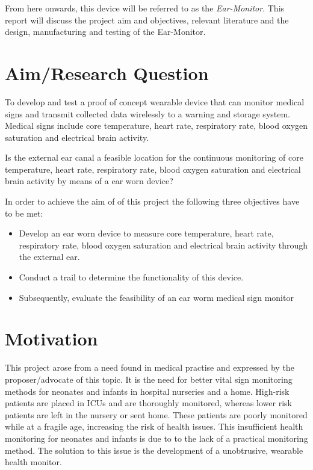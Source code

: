 \medskip

From here onwards, this device will be referred to as the \textit{Ear-Monitor}. This report will discuss the project aim and objectives, relevant literature and the design, manufacturing and testing of the Ear-Monitor.

\section{Aim/Research Question}
To develop and test a proof of concept wearable device that can monitor medical signs and transmit collected data wirelessly to a warning and storage system. Medical signs include core temperature, heart rate, respiratory rate, blood oxygen saturation and electrical brain activity.

\medskip

Is the external ear canal a feasible location for the continuous monitoring of core temperature, heart rate, respiratory rate, blood oxygen saturation and electrical brain activity by means of a ear worn device?

\medskip

In order to achieve the aim of of this project the following three objectives have to be met:
\begin{itemize}
\item Develop an ear worn device to measure core temperature, heart rate, respiratory rate, blood oxygen saturation and electrical brain activity through the external ear.
\item Conduct a trail to determine the functionality of this device.
\item Subsequently, evaluate the feasibility of an ear worm medical sign monitor
\end{itemize}

\section{Motivation}
This project arose from a need found in medical practise and expressed by the proposer/advocate of this topic. It is the need for better vital sign monitoring methods for neonates and infants in hospital nurseries and a home. High-risk patients are placed in ICUs and are thoroughly monitored, whereas lower risk patients are left in the nursery or sent home. These patients are poorly monitored while at a fragile age, increasing the risk of health issues. This insufficient health monitoring for neonates and infants is due to to the lack of a practical monitoring method. The solution to this issue is the development of a unobtrusive, wearable health monitor.

